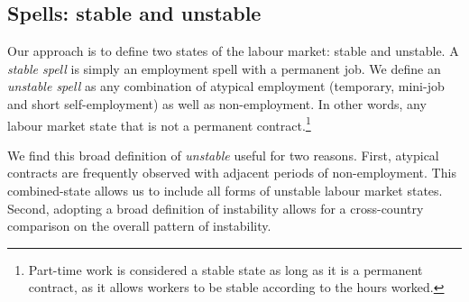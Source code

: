 \documentclass[12pt]{article}
\theoremstyle{definition}
\theoremstyle{remark}
\begin{document}



\subsection*{Spells: stable and unstable}\label{sec:unstable_spells_def}

Our approach is to define two states of the labour market: stable and unstable. A \emph{stable spell} is simply an employment spell 
with a permanent job. 
We define an \emph{unstable spell} as any combination of  atypical employment (temporary, mini-job and short self-employment) 
as well as non-employment. In other words, any labour market state that is not a permanent contract.\footnote{Part-time work is considered a stable state as long as it is a permanent contract, as it allows workers to be stable according to the hours worked.
}



We find this broad definition of \emph{unstable} useful for two reasons. First, atypical contracts are frequently observed with adjacent periods of non-employment. This combined-state allows us to include all forms of unstable labour market states.
Second, adopting a broad definition of instability allows for a cross-country comparison on the overall pattern of instability. 
\end{document}
